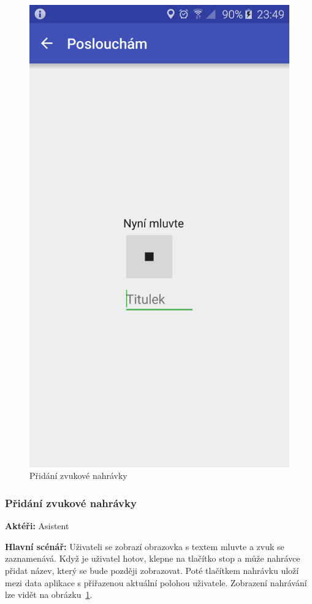 \documentclass[czech,master,public,dept460,male,java,cpdeclaration]{diploma}
\newcommand{\usecase}[2]{\subsubsection{#1}\label{#2}}
\begin{document}
\begin{figure}[H]
\begin{minipage}{.5\textwidth}
                     \includegraphics[scale=0.14]{img/screen/nahravaninahravky.png}
             \caption{Přidání zvukové nahrávky}
             \label{fig:pridaninahravky}

       \end{minipage}
\end{figure}

\usecase{Přidání zvukové nahrávky}{pridaninahravky}
\textbf{Aktéři:} Asistent

\vspace{0.1cm}
\noindent
\textbf{Hlavní scénář:} Uživateli se zobrazí obrazovka s textem mluvte a zvuk se zaznamenává.
Když je uživatel hotov, klepne na tlačítko stop a může nahrávce přidat název, který se bude později zobrazovat.
Poté tlačítkem nahrávku uloží mezi data aplikace s přiřazenou aktuální polohou uživatele.
Zobrazení nahrávání lze vidět na obrázku~\ref{fig:pridaninahravky}.
\end{document}
